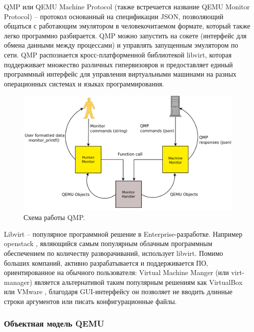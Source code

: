 QMP или QEMU Machine Protocol (также встречается название QEMU Monitor Protocol) -- протокол
основанный на спецификации JSON, позволяющий общаться с работающим эмулятором в человекочитаемом
формате, который также легко программно разбирается.
QMP можно запустить на сокете (интерфейс для обмена данными между процессами) и управлять запущенным эмулятором по сети.
QMP распознается кросс-платформенной библиотекой libvirt, которая поддерживает множество
различных гипервизовров и предоставляет единый программный интерфейс для управления виртуальными машинами на
разных операционных системах и языках программирования.

\begin{figure}[!htbp]
    \centering
    \begin{adjustbox}{max totalsize={\textwidth}{\textheight}}
        \includegraphics[]{images/qmp.png}
    \end{adjustbox}
    \caption{Схема работы QMP.}\label{fig:qmp}
\end{figure}

Libvirt -- популярное программной решение в Enterprise-разработке. Например openstack \cite{openstack}, являющийся
самым популярным облачным программным обеспечением по количеству разворачиваний, использует libvirt.
Помимо больших компаний, активно разрабатывается и поддерживается ПО, ориентированное на обычного пользователя:
Virtual Machine Manger (или virt-manager) является альтернативой таким популярным решениям как VirtualBox \cite{virtualbox} или
VMware \cite{vmware}, благодаря GUI-интерфейсу он позволяет не вводить длинные строки аргументов или писать
конфигурационные файлы.

\subsubsection{Объектная модель QEMU}\label{sec:ch1/sec4/sub3/sub3}

